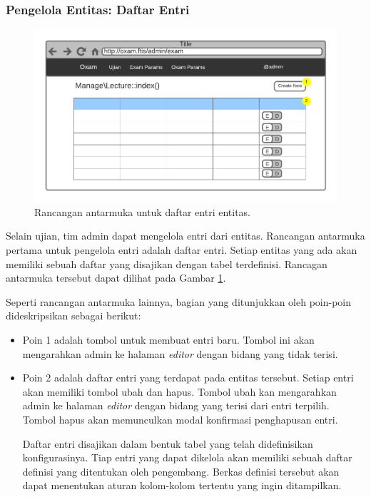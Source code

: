 \subsubsection{Pengelola Entitas: Daftar Entri}
    \begin{figure}
        \centering
        \includegraphics{Gambar/mockups/Mockup--Admin - Entity Lister.pdf}
        \caption{Rancangan antarmuka untuk daftar entri entitas.}
        \label{fig:mockup_admin_entity_lister}
    \end{figure}
    Selain ujian, tim admin dapat mengelola entri dari entitas. Rancangan
    antarmuka pertama untuk pengelola entri adalah daftar entri. Setiap entitas
    yang ada akan memiliki sebuah daftar yang disajikan dengan tabel
    terdefinisi. Rancagan antarmuka tersebut dapat dilihat pada Gambar
    \ref{fig:mockup_admin_entity_lister}.
    
    Seperti rancangan antarmuka lainnya, bagian yang ditunjukkan oleh poin-poin
    dideskripsikan sebagai berikut:
    \begin{itemize}
        \item Poin 1 adalah tombol untuk membuat entri baru. Tombol ini akan
            mengarahkan admin ke halaman \textit{editor} dengan bidang yang
            tidak terisi.
            
        \item Poin 2 adalah daftar entri yang terdapat pada entitas tersebut.
            Setiap entri akan memiliki tombol ubah dan hapus. Tombol ubah kan
            mengarahkan admin ke halaman \textit{editor} dengan bidang yang
            terisi dari entri terpilih. Tombol hapus akan memunculkan modal
            konfirmasi penghapusan entri.
            
            Daftar entri disajikan dalam bentuk tabel yang telah didefinisikan
            konfigurasinya. Tiap entri yang dapat dikelola akan memiliki sebuah
            daftar definisi yang ditentukan oleh pengembang. Berkas definisi
            tersebut akan dapat menentukan aturan kolom-kolom tertentu yang
            ingin ditampilkan.
    \end{itemize}
    
